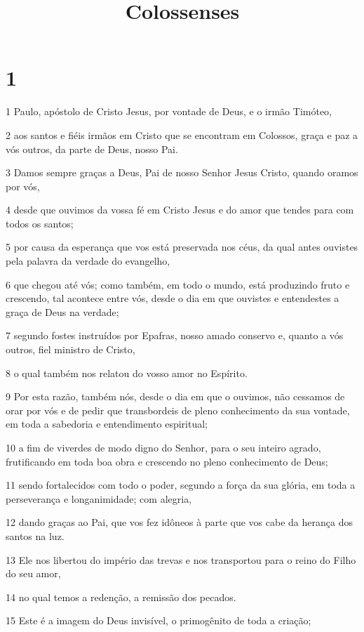 

\title{Colossenses}


\chapter{1}

\par 1 Paulo, apóstolo de Cristo Jesus, por vontade de Deus, e o irmão Timóteo,
\par 2 aos santos e fiéis irmãos em Cristo que se encontram em Colossos, graça e paz a vós outros, da parte de Deus, nosso Pai.
\par 3 Damos sempre graças a Deus, Pai de nosso Senhor Jesus Cristo, quando oramos por vós,
\par 4 desde que ouvimos da vossa fé em Cristo Jesus e do amor que tendes para com todos os santos;
\par 5 por causa da esperança que vos está preservada nos céus, da qual antes ouvistes pela palavra da verdade do evangelho,
\par 6 que chegou até vós; como também, em todo o mundo, está produzindo fruto e crescendo, tal acontece entre vós, desde o dia em que ouvistes e entendestes a graça de Deus na verdade;
\par 7 segundo fostes instruídos por Epafras, nosso amado conservo e, quanto a vós outros, fiel ministro de Cristo,
\par 8 o qual também nos relatou do vosso amor no Espírito.
\par 9 Por esta razão, também nós, desde o dia em que o ouvimos, não cessamos de orar por vós e de pedir que transbordeis de pleno conhecimento da sua vontade, em toda a sabedoria e entendimento espiritual;
\par 10 a fim de viverdes de modo digno do Senhor, para o seu inteiro agrado, frutificando em toda boa obra e crescendo no pleno conhecimento de Deus;
\par 11 sendo fortalecidos com todo o poder, segundo a força da sua glória, em toda a perseverança e longanimidade; com alegria,
\par 12 dando graças ao Pai, que vos fez idôneos à parte que vos cabe da herança dos santos na luz.
\par 13 Ele nos libertou do império das trevas e nos transportou para o reino do Filho do seu amor,
\par 14 no qual temos a redenção, a remissão dos pecados.
\par 15 Este é a imagem do Deus invisível, o primogênito de toda a criação;
